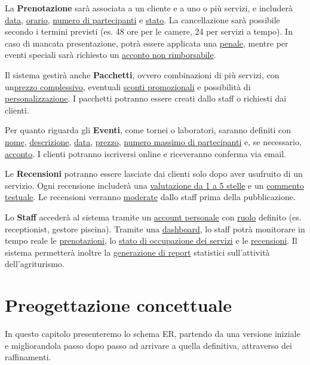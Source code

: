 \documentclass[a4paper,12pt]{report}
\begin{document}
La \textbf{Prenotazione} sarà associata a un cliente e a uno o più servizi, e includerà \underline{data}, \underline{orario}, \underline{numero di
	partecipanti} e \underline{stato}. La cancellazione sarà possibile secondo i termini previsti (es. 48 ore per le camere, 24 per servizi a tempo). In caso di
mancata presentazione, potrà essere applicata una \underline{penale}, mentre per eventi speciali sarà richiesto un \underline{acconto non rimborsabile}.

Il sistema gestirà anche \textbf{Pacchetti}, ovvero combinazioni di più servizi, con un\newline \underline{prezzo complessivo},
eventuali \underline{sconti promozionali} e possibilità \newline di \underline{personalizzazione}. I pacchetti potranno essere creati dallo staff o richiesti dai clienti.

Per quanto riguarda gli \textbf{Eventi}, come tornei o laboratori, saranno definiti con \underline{nome}, \newline \underline{descrizione}, \underline{data},
\underline{prezzo}, \underline{numero massimo di partecipanti} e, se necessario, \underline{acconto}. I clienti potranno iscriversi online e riceveranno conferma via email.

Le \textbf{Recensioni} potranno essere lasciate dai clienti solo dopo aver usufruito di un servizio. Ogni recensione includerà
una \underline{valutazione da 1 a 5 stelle} e un \underline{commento testuale}. Le recensioni verranno \underline{moderate} dallo staff prima della pubblicazione.

Lo \textbf{Staff} accederà al sistema tramite un \underline{account personale} con \underline{ruolo} definito (es. receptionist, gestore piscina). Tramite
una \underline{dashboard}, lo staff potrà monitorare in tempo reale le \underline{prenotazioni}, lo \underline{stato di occupazione dei servizi} e le
\underline{recensioni}. Il sistema permetterà inoltre la \underline{generazione di report} statistici sull'attività dell'agriturismo.


\chapter{Preogettazione concettuale}
In questo capitolo presenteremo lo schema ER, partendo da una versione iniziale e migliorandola passo dopo passo ad arrivare a quella
definitiva, attraverso dei raffinamenti.
\end{document}
